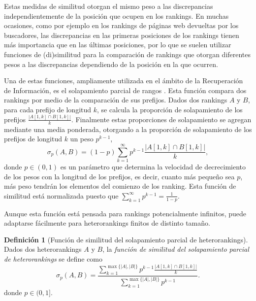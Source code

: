 \documentclass[a4paper,10pt,twoside]{article}
\theoremstyle{definition}
\newtheorem{definition}{Definición}
\begin{document}
Estas medidas de similitud otorgan el mismo peso a las discrepancias independientemente de la posición que ocupen en los rankings. 
En muchas ocasiones, como por ejemplo en los rankings de páginas web devueltas por los buscadores, las discrepancias en las primeras posiciones de los rankings tienen más importancia que en las últimas posiciones, por lo que se suelen utilizar funciones de (di)similitud para la comparación de rankings que otorgan diferentes pesos a las discrepancias dependiendo de la posición en la que ocurren. 

Una de estas funciones, ampliamente utilizada en el ámbito de la Recuperación de Información, es el solapamiento parcial de rangos \cite{webber2010similarity}.
Esta función compara dos rankings por medio de la comparación de sus prefijos.
Dados dos rankings $A$ y $B$, para cada prefijo de longitud $k$, se calcula la proporción de solapamiento de los prefijos $\frac{|A[1,k]\cap B[1,k]|}{k}$. 
Finalmente estas proporciones de solapamiento se agregan mediante una media ponderada, otorgando a la proporción de solapamiento de los prefijos de longitud $k$ un peso $p^{k-1}$,
\[
\sigma_p(A,B)=(1-p)\sum_{k=1}^\infty p^{k-1}\frac{|A[1,k]\cap B[1,k]|}{k},
\]
donde $p\in (0,1)$ es un parámetro que determina la velocidad de decrecimiento de los pesos con la longitud de los prefijos, es decir, cuanto más pequeño sea $p$, más peso tendrán los elementos del comienzo de los ranking. 
Esta función de similitud está normalizada puesto que $\sum_{k=1}^\infty p^{k-1}=\frac{1}{1-p}$.

Aunque esta función está pensada para rankings potencialmente infinitos, puede adaptarse fácilmente para heterorankings finitos de distinto tamaño. 

\begin{definition}[Función de similitud del solapamiento parcial de heterorankings]
Dados dos heterorankings $A$ y $B$, la \emph{función de similitud del solapamiento parcial de heterorankings} se define como
\[
\sigma_p(A,B) = \frac{\displaystyle \sum_{k=1}^{\max\{|A|,|B|\}}p^{k-1}\frac{|A[1,k]\cap
B[1,k]|}{k}}{\displaystyle\sum_{k=1}^{\max\{|A|,|B|\}}p^{k-1}}.
\]
donde $p\in (0,1]$. 
\end{definition}
\end{document}
